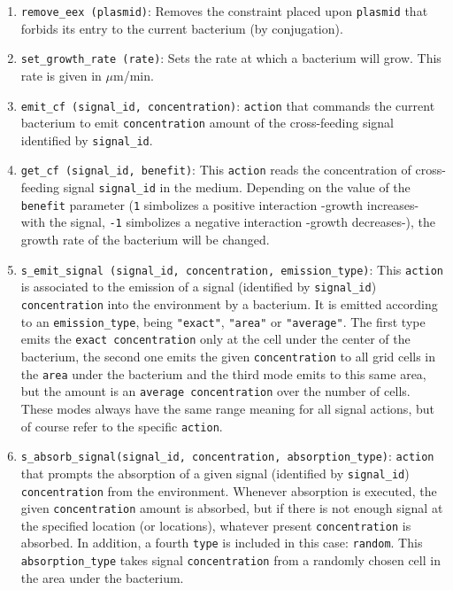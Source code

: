 \documentclass[10pt,a4paper]{article}
\begin{document}
\begin{enumerate}
	\item \texttt{remove\_eex (plasmid)}: Removes the constraint placed upon \texttt{plasmid} that forbids its entry to the current bacterium (by conjugation).
	\item \texttt{set\_growth\_rate (rate)}: Sets the  rate  at which a bacterium will grow. This rate is given in $\mu$m/min.
	\item \texttt{emit\_cf (signal\_id, concentration)}: \texttt{action} that commands the current bacterium to emit \texttt{concentration} amount of the cross-feeding signal identified by \texttt{signal\_id}.
	\item \texttt{get\_cf (signal\_id, benefit)}: This \texttt{action} reads the concentration of cross-feeding signal \texttt{signal\_id} in the medium. Depending on the value of the \texttt{benefit}  parameter (\texttt{1} simbolizes a positive interaction -growth increases- with the signal, \texttt{-1} simbolizes a negative interaction -growth decreases-), the growth rate of the bacterium will be changed.
	\item \texttt{s\_emit\_signal (signal\_id, concentration, emission\_type)}: This \texttt{action} is associated to the emission of a signal (identified by \texttt{signal\_id}) \texttt{concentration} into the environment by a bacterium. It is emitted according to an \texttt{emission\_type}, being \texttt{"{}exact"{}}, \texttt{"{}area"{}} or \texttt{"{}average"{}}. The first type emits the \texttt{exact concentration} only at the cell under the center of the bacterium, the second one emits the given \texttt{concentration} to all grid cells in the \texttt{area} under the bacterium and the third mode emits to this same area, but the amount is an \texttt{average concentration} over the number of cells. These modes always have the same range meaning for all signal actions, but of course refer to the specific \texttt{action}.
	\item \texttt{s\_absorb\_signal(signal\_id, concentration, absorption\_type)}: \texttt{action} that prompts the absorption of a given signal (identified by \texttt{signal\_id}) \texttt{concentration} from the environment. Whenever absorption is executed, the given \texttt{concentration} amount is absorbed, but if there is not enough signal at the specified location (or locations), whatever present \texttt{concentration} is absorbed. In addition, a fourth \texttt{type} is included in this case: \texttt{random}. This \texttt{absorption\_type} takes signal \texttt{concentration} from a randomly chosen cell in the area under the bacterium.

\end{enumerate}
\end{document}
